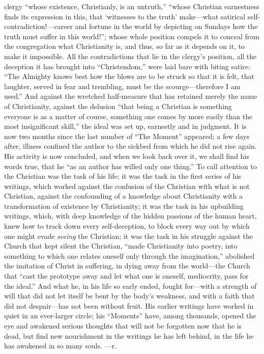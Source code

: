 \documentclass[12pt,a4paper]{article}
\begin{document}
clergy ``whose existence, Christianly, is an untruth,'' ``whose Christian
earnestness finds its expression in this, that `witnesses to the truth'
make---what satirical self-contradiction!---career and fortune in the world by
depicting on Sundays how the truth must suffer in this world!''; whose whole
position compels it to conceal from the congregation what Christianity is, and
thus, so far as it depends on it, to make it impossible. All the contradictions
that lie in the clergy's position, all the deception it has brought into
``Christendom,'' were laid bare with biting satire: ``The Almighty knows best how
the blows are to be struck so that it is felt, that laughter, served in fear and
trembling, must be the scourge---therefore I am used.'' And against the wretched
half-measure that has retained merely the name of Christianity, against the
delusion ``that being a Christian is something everyone is as a matter of course,
something one comes by more easily than the most insignificant skill,'' the ideal
was set up, earnestly and in judgment. It is now two months since the last number
of ``The Moment'' appeared; a few days after, illness confined the author to the
sickbed from which he did not rise again. His activity is now concluded, and when
we look back over it, we shall find his words true, that he ``as an author has
willed only one thing.'' To call attention to the Christian was the task of his
life; it was the task in the first series of his writings, which worked against the
confusion of the Christian with what is not Christian, against the confounding of a
knowledge about Christianity with a transformation of existence by Christianity; it
was the task in his upbuilding writings, which, with deep knowledge of the hidden
passions of the human heart, knew how to track down every self-deception, to block
every way out by which one might evade \emph{seeing} the Christian; it was the task in
his struggle against the Church that kept silent the Christian, ``made Christianity
into poetry, into something to which one relates oneself only through the
imagination,'' abolished the imitation of Christ in suffering, in dying away from
the world---the Church that ``cast the prototype away and let what one is oneself,
mediocrity, pass for the ideal.'' And what he, in his life so early ended, fought
for---with a strength of will that did not let itself be bent by the body's
weakness, and with a faith that did not despair---has not been without fruit. His
earlier writings have worked in quiet in an ever-larger circle; his ``Moments''
have, among thousands, opened the eye and awakened serious thoughts that will
not be forgotten now that he is dead, but find new nourishment in the writings he
has left behind, in the life he has awakened in so many souls. \hfill ---r.
\end{document}
